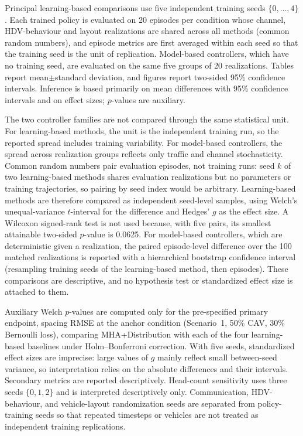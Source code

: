 \documentclass{ieeeaccess}
\begin{document}
Principal learning-based comparisons use five independent training seeds $\{0,\ldots,4\}$. Each trained policy is evaluated on 20 episodes per condition whose channel, HDV-behaviour and layout realizations are shared across all methods (common random numbers), and episode metrics are first averaged within each seed so that the training seed is the unit of replication. Model-based controllers, which have no training seed, are evaluated on the same five groups of 20 realizations. Tables report mean$\pm$standard deviation, and figures report two-sided 95\% confidence intervals. Inference is based primarily on mean differences with 95\% confidence intervals and on effect sizes; $p$-values are auxiliary. %

The two controller families are not compared through the same statistical unit. For learning-based methods, the unit is the independent training run, so the reported spread includes training variability. For model-based controllers, the spread across realization groups reflects only traffic and channel stochasticity. Common random numbers pair evaluation episodes, not training runs: seed $k$ of two learning-based methods shares evaluation realizations but no parameters or training trajectories, so pairing by seed index would be arbitrary. Learning-based methods are therefore compared as independent seed-level samples, using Welch's unequal-variance $t$-interval for the difference and Hedges' $g$ as the effect size. A Wilcoxon signed-rank test is not used because, with five pairs, its smallest attainable two-sided $p$-value is 0.0625. For model-based controllers, which are deterministic given a realization, the paired episode-level difference over the 100 matched realizations is reported with a hierarchical bootstrap confidence interval (resampling training seeds of the learning-based method, then episodes). These comparisons are descriptive, and no hypothesis test or standardized effect size is attached to them. %

Auxiliary Welch $p$-values are computed only for the pre-specified primary endpoint, spacing RMSE at the anchor condition (Scenario~1, 50\% CAV, 30\% Bernoulli loss), comparing MHA+Distribution with each of the four learning-based baselines under Holm--Bonferroni correction. With five seeds, standardized effect sizes are imprecise: large values of $g$ mainly reflect small between-seed variance, so interpretation relies on the absolute differences and their intervals. Secondary metrics are reported descriptively. Head-count sensitivity uses three seeds $\{0,1,2\}$ and is interpreted descriptively only. Communication, HDV-behaviour, and vehicle-layout randomization seeds are separated from policy-training seeds so that repeated timesteps or vehicles are not treated as independent training replications. %
\end{document}
